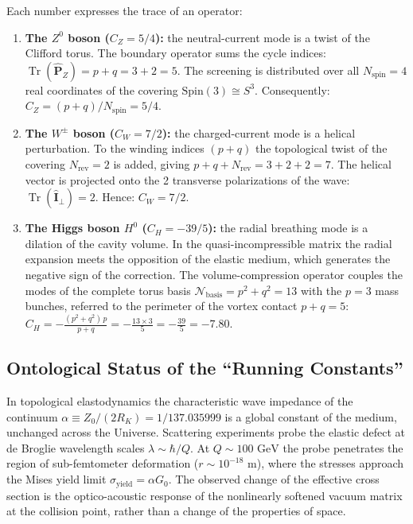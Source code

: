 \documentclass[11pt,a4paper]{article}
\theoremstyle{definition}
\theoremstyle{remark}
\begin{document}
Each number expresses the trace of an operator:
\begin{enumerate}
	\item \textbf{The $Z^0$ boson ($C_Z = 5/4$):} the neutral-current mode is a twist of the Clifford torus. The boundary operator sums the cycle indices: $\operatorname{Tr}(\hat{\mathbf{P}}_Z) = p + q = 3 + 2 = 5$. The screening is distributed over all $N_{\mathrm{spin}} = 4$ real coordinates of the covering $\mathrm{Spin}(3) \cong S^3$. Consequently: $C_Z = (p + q) / N_{\mathrm{spin}} = 5/4$.
	\item \textbf{The $W^\pm$ boson ($C_W = 7/2$):} the charged-current mode is a helical perturbation. To the winding indices $(p+q)$ the topological twist of the covering $N_{\mathrm{rev}} = 2$ is added, giving $p + q + N_{\mathrm{rev}} = 3 + 2 + 2 = 7$. The helical vector is projected onto the 2 transverse polarizations of the wave: $\operatorname{Tr}(\hat{\mathbf{I}}_{\perp}) = 2$. Hence: $C_W = 7/2$.
	\item \textbf{The Higgs boson $H^0$ ($C_H = -39/5$):} the radial breathing mode is a dilation of the cavity volume. In the quasi-incompressible matrix the radial expansion meets the opposition of the elastic medium, which generates the negative sign of the correction. The volume-compression operator couples the modes of the complete torus basis $\mathcal{N}_{\mathrm{basis}} = p^2 + q^2 = 13$ with the $p=3$ mass bunches, referred to the perimeter of the vortex contact $p + q = 5$: $C_H = -\frac{(p^2 + q^2) \, p}{p + q} = -\frac{13 \times 3}{5} = -\frac{39}{5} = -7.80$.
\end{enumerate}

\subsection{Ontological Status of the ``Running Constants''}

In topological elastodynamics the characteristic wave impedance of the continuum $\alpha \equiv Z_0 / (2 R_K) = 1/137.035999$ is a global constant of the medium, unchanged across the Universe. Scattering experiments probe the elastic defect at de Broglie wavelength scales $\lambda \sim \hbar / Q$. At $Q \sim 100\text{ GeV}$ the probe penetrates the region of sub-femtometer deformation ($r \sim 10^{-18}\text{ m}$), where the stresses approach the Mises yield limit $\sigma_{\mathrm{yield}} = \alpha G_0$. The observed change of the effective cross section is the optico-acoustic response of the nonlinearly softened vacuum matrix at the collision point, rather than a change of the properties of space.
\end{document}
